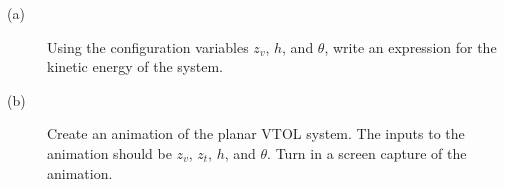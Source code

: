\begin{description}
\item[(a)] Using the configuration variables $z_v$, $h$, and $\theta$, write an expression for the kinetic energy of the system.
\item[(b)] Create an animation of the planar VTOL system.
The inputs to the animation should be $z_v$, $z_t$, $h$, and $\theta$.
Turn in a screen capture of the animation.
\end{description}